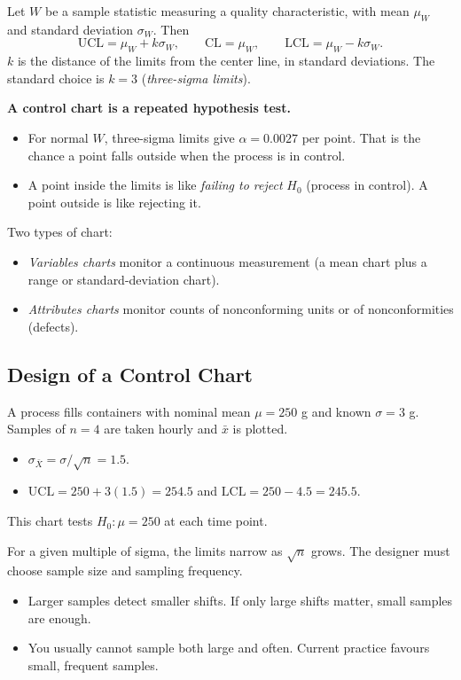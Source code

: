 \begin{definition}
Let $W$ be a sample statistic measuring a quality characteristic, with mean $\mu_W$ and standard deviation $\sigma_W$. Then
\[ \mathrm{UCL}=\mu_W+k\sigma_W,\qquad\mathrm{CL}=\mu_W,\qquad\mathrm{LCL}=\mu_W-k\sigma_W. \]
$k$ is the distance of the limits from the center line, in standard deviations. The standard choice is $k=3$ (\emph{three-sigma limits}).
\end{definition}

\textbf{A control chart is a repeated hypothesis test.}
\begin{itemize}
  \item For normal $W$, three-sigma limits give $\alpha=0.0027$ per point. That is the chance a point falls outside when the process is in control.
  \item A point inside the limits is like \emph{failing to reject} $H_0$ (process in control). A point outside is like rejecting it.
\end{itemize}

Two types of chart:
\begin{itemize}
  \item \emph{Variables charts} monitor a continuous measurement (a mean chart plus a range or standard-deviation chart).
  \item \emph{Attributes charts} monitor counts of nonconforming units or of nonconformities (defects).
\end{itemize}

\subsection{Design of a Control Chart}

\begin{example}\label{ex:xbardesign}
A process fills containers with nominal mean $\mu=250$ g and known $\sigma=3$ g. Samples of $n=4$ are taken hourly and $\bar{x}$ is plotted.
\begin{itemize}
  \item $\sigma_{\bar{X}}=\sigma/\sqrt n=1.5$.
  \item $\mathrm{UCL}=250+3(1.5)=254.5$ and $\mathrm{LCL}=250-4.5=245.5$.
\end{itemize}
This chart tests $H_0:\mu=250$ at each time point.
\end{example}

For a given multiple of sigma, the limits narrow as $\sqrt n$ grows. The designer must choose sample size and sampling frequency.
\begin{itemize}
  \item Larger samples detect smaller shifts. If only large shifts matter, small samples are enough.
  \item You usually cannot sample both large and often. Current practice favours small, frequent samples.
\end{itemize}

